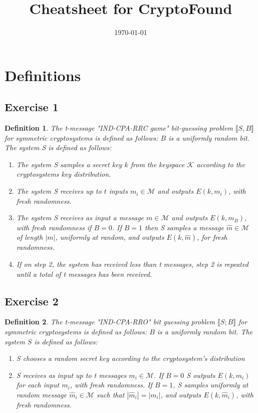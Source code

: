 \documentclass[a4paper,german]{article}
\title{Cheatsheet for CryptoFound}
\date{\today}
\newtheorem{definition}{Definition}
\begin{document}
\maketitle

\section*{Definitions}
\subsection*{Exercise 1}
\begin{definition}
	The \emph{t-message} "IND-CPA-RRC game" bit-guessing problem $\llbracket S, B\rrbracket$ for symmetric cryptosystems is defined as follows: $B$ is a uniformly random bit. The system S is defined as follows:

	\begin{enumerate}
	
		\item  The system S samples a secret key $k$ from the keyspace $\mathcal{K}$ according to the cryptosystems key distribution.
		\item  The system S receives up to $t$ inputs $m_i \in \mathcal{M}$ and outputs $E(k, m_i)$, with fresh randomness.
		\item  The system S receives as input a message $m \in \mathcal{M}$ and outputs  $E(k, m_B)$, with fresh randomness if $B = 0$. If $B=1$ then S samples a message $\hat{m} \in \mathcal{M}$ of length $|m|$, uniformly at random, and outputs $E(k, \hat{m})$, for fresh randomness.
		 \item If on step 2, the system has received less than t messages, step 2 is repeated until a total of t messages has been received.
	
	\end{enumerate}
\end{definition}
\subsection*{Exercise 2}

\begin{definition}
	The t-message "IND-CPA-RRO" bit guessing problem $\llbracket S; B \rrbracket$ for symmetric cryptosystems is defined as follows: $B$ is a uniformly random bit. The system $S$ is defined as follows:

	\begin{enumerate}
	
		\item  S chooses a random secret key according to the cryptosystem's distribution
		\item  S receives as input up to t messages $m_i \in \mathcal{M}$. If $B=0$ S outputs $E(k, m_i)$ for each input $m_i$, with fresh randomness. If $B=1$, S samples uniformly at random message $\hat{m}_i \in \mathcal{M}$ such that $|\hat{m}_i| = |m_i|$, and outputs $E(k, \hat{m}_i)$, with fresh randomness.
	
	\end{enumerate}
\end{definition}
\end{document}
